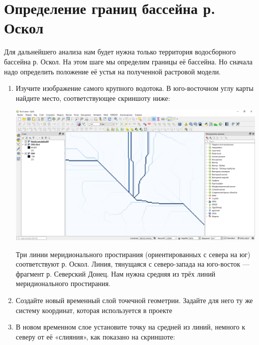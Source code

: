 \documentclass[
  12pt,
]{book}
\begin{document}
\hypertarget{hydrodem-basin}{%
\section{Определение границ бассейна р. Оскол}\label{hydrodem-basin}}

Для дальнейшего анализа нам будет нужна только территория водосборного бассейна р. Оскол. На этом шаге мы определим границы её бассейна. Но сначала надо определить положение её устья на полученной растровой модели.

\begin{enumerate}
\def\labelenumi{\arabic{enumi}.}
\item
  Изучите изображение самого крупного водотока. В юго-восточном углу карты найдите место, соответствующее скриншоту ниже:

  \includegraphics{images/Ex13/oskol_mouth.png}

  Три линии меридионального простирания (ориентированных с севера на юг) соответствуют р. Оскол. Линия, тянущаяся с северо-запада на юго-восток --- фрагмент р. Северский Донец. Нам нужна средняя из трёх линий меридионального простирания.
\item
  Создайте новый временный слой точечной геометрии. Задайте для него ту же систему координат, которая используется в проекте
\item
  В новом временном слое установите точку на средней из линий, немного к северу от её «слияния», как показано на скриншоте:


\end{enumerate}
\end{document}

